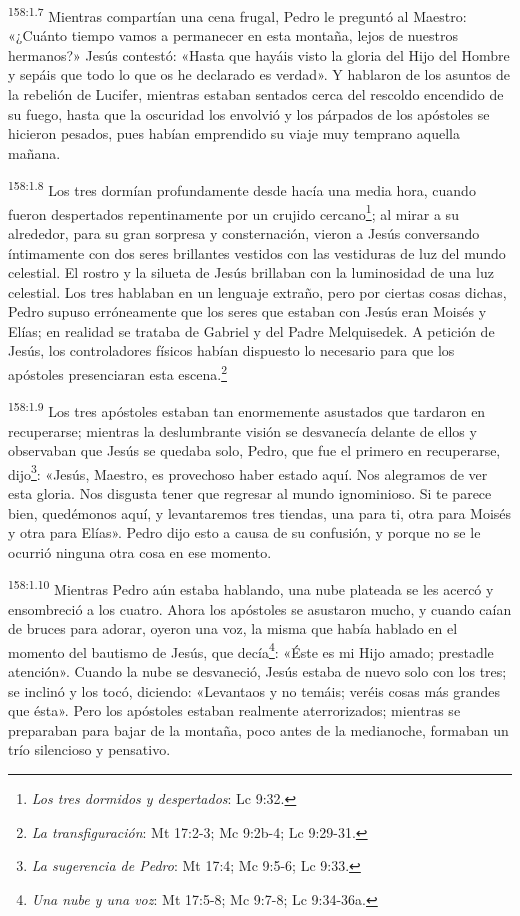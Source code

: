 \par 
\textsuperscript{158:1.7} Mientras compartían una cena frugal, Pedro le preguntó al Maestro: «¿Cuánto tiempo vamos a permanecer en esta montaña, lejos de nuestros hermanos?» Jesús contestó: «Hasta que hayáis visto la gloria del Hijo del Hombre y sepáis que todo lo que os he declarado es verdad». Y hablaron de los asuntos de la rebelión de Lucifer, mientras estaban sentados cerca del rescoldo encendido de su fuego, hasta que la oscuridad los envolvió y los párpados de los apóstoles se hicieron pesados, pues habían emprendido su viaje muy temprano aquella mañana.

\par 
\textsuperscript{158:1.8} Los tres dormían profundamente desde hacía una media hora, cuando fueron despertados repentinamente por un crujido cercano\footnote{\textit{Los tres dormidos y despertados}: Lc 9:32.}; al mirar a su alrededor, para su gran sorpresa y consternación, vieron a Jesús conversando íntimamente con dos seres brillantes vestidos con las vestiduras de luz del mundo celestial. El rostro y la silueta de Jesús brillaban con la luminosidad de una luz celestial. Los tres hablaban en un lenguaje extraño, pero por ciertas cosas dichas, Pedro supuso erróneamente que los seres que estaban con Jesús eran Moisés y Elías; en realidad se trataba de Gabriel y del Padre Melquisedek. A petición de Jesús, los controladores físicos habían dispuesto lo necesario para que los apóstoles presenciaran esta escena.\footnote{\textit{La transfiguración}: Mt 17:2-3; Mc 9:2b-4; Lc 9:29-31.}

\par 
\textsuperscript{158:1.9} Los tres apóstoles estaban tan enormemente asustados que tardaron en recuperarse; mientras la deslumbrante visión se desvanecía delante de ellos y observaban que Jesús se quedaba solo, Pedro, que fue el primero en recuperarse, dijo\footnote{\textit{La sugerencia de Pedro}: Mt 17:4; Mc 9:5-6; Lc 9:33.}: «Jesús, Maestro, es provechoso haber estado aquí. Nos alegramos de ver esta gloria. Nos disgusta tener que regresar al mundo ignominioso. Si te parece bien, quedémonos aquí, y levantaremos tres tiendas, una para ti, otra para Moisés y otra para Elías». Pedro dijo esto a causa de su confusión, y porque no se le ocurrió ninguna otra cosa en ese momento.

\par 
\textsuperscript{158:1.10} Mientras Pedro aún estaba hablando, una nube plateada se les acercó y ensombreció a los cuatro. Ahora los apóstoles se asustaron mucho, y cuando caían de bruces para adorar, oyeron una voz, la misma que había hablado en el momento del bautismo de Jesús, que decía\footnote{\textit{Una nube y una voz}: Mt 17:5-8; Mc 9:7-8; Lc 9:34-36a.}: «Éste es mi Hijo amado; prestadle atención». Cuando la nube se desvaneció, Jesús estaba de nuevo solo con los tres; se inclinó y los tocó, diciendo: «Levantaos y no temáis; veréis cosas más grandes que ésta». Pero los apóstoles estaban realmente aterrorizados; mientras se preparaban para bajar de la montaña, poco antes de la medianoche, formaban un trío silencioso y pensativo.

